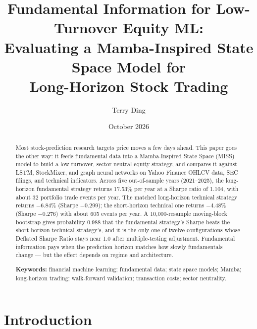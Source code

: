 \documentclass[11pt,twocolumn]{article}
\title{\bfseries Fundamental Information for Low-Turnover Equity ML:\\
Evaluating a Mamba-Inspired State Space Model for\\
Long-Horizon Stock Trading}
\author{Terry Ding}
\date{October 2026}
\begin{document}
\maketitle

\begin{abstract}
\noindent
Most stock-prediction research targets price moves a few days ahead. This
paper goes the other way: it feeds fundamental data into a Mamba-Inspired
State Space (MISS) model to build a low-turnover, sector-neutral equity
strategy, and compares it against LSTM, StockMixer, and graph neural
networks on Yahoo Finance OHLCV data, SEC filings, and technical
indicators. Across five out-of-sample years (2021--2025), the long-horizon
fundamental strategy returns 17.53\% per year at a Sharpe ratio of 1.104,
with about 32 portfolio trade events per year. The matched long-horizon
technical strategy returns $-6.84\%$ (Sharpe $-0.299$); the short-horizon
technical one returns $-4.48\%$ (Sharpe $-0.276$) with about 605 events per
year. A 10{,}000-resample moving-block bootstrap gives probability 0.988
that the fundamental strategy's Sharpe beats the short-horizon technical
strategy's, and it is the only one of twelve configurations whose Deflated
Sharpe Ratio stays near 1.0 after multiple-testing adjustment. Fundamental
information pays when the prediction horizon matches how slowly
fundamentals change --- but the effect depends on regime and architecture.

\medskip
\noindent\textbf{Keywords:} financial machine learning; fundamental data;
state space models; Mamba; long-horizon trading; walk-forward validation;
transaction costs; sector neutrality.
\end{abstract}

\section{Introduction}
\end{document}
